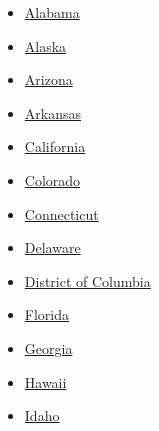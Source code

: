 \begin{itemize}
\tightlist
\item
  \href{https://www.nytimes3xbfgragh.onion/elections/results/alabama}{Alabama}
\item
  \href{https://www.nytimes3xbfgragh.onion/elections/results/alaska}{Alaska}
\item
  \href{https://www.nytimes3xbfgragh.onion/elections/results/arizona}{Arizona}
\item
  \href{https://www.nytimes3xbfgragh.onion/elections/results/arkansas}{Arkansas}
\item
  \href{https://www.nytimes3xbfgragh.onion/elections/results/california}{California}
\item
  \href{https://www.nytimes3xbfgragh.onion/elections/results/colorado}{Colorado}
\item
  \href{https://www.nytimes3xbfgragh.onion/elections/results/connecticut}{Connecticut}
\item
  \href{https://www.nytimes3xbfgragh.onion/elections/results/delaware}{Delaware}
\item
  \href{https://www.nytimes3xbfgragh.onion/elections/results/district-of-columbia}{District
  of Columbia}
\item
  \href{https://www.nytimes3xbfgragh.onion/elections/results/florida}{Florida}
\item
  \href{https://www.nytimes3xbfgragh.onion/elections/results/georgia}{Georgia}
\item
  \href{https://www.nytimes3xbfgragh.onion/elections/results/hawaii}{Hawaii}
\item
  \href{https://www.nytimes3xbfgragh.onion/elections/results/idaho}{Idaho}
\end{itemize}

